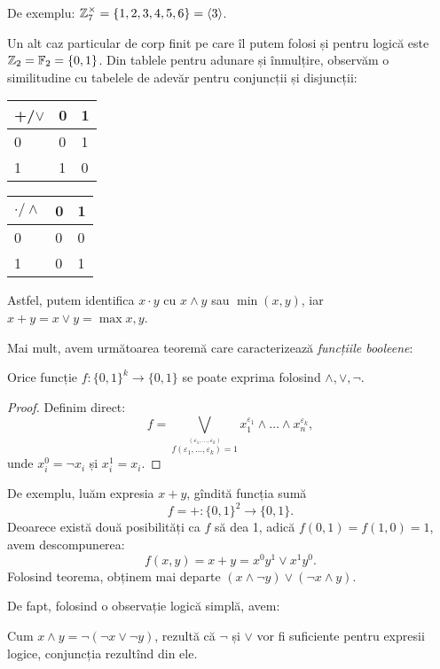 De exemplu: $ \mathbb{Z}_7^\times = \{ 1, 2, 3, 4, 5, 6 \} = \langle 3 \rangle $.

Un alt caz particular de corp finit pe care îl putem folosi și pentru
logică este $ \mathbb{Z}_2 = \mathbb{F}_2 = \{ 0, 1 \} $. Din tablele pentru adunare
și înmulțire, observăm o similitudine cu tabelele de adevăr pentru
conjuncții și disjuncții:
\begin{center}
  \begin{tabular}{l|ll}
    +/$\lor$ & 0 & 1 \\
    \hline
    0 & 0 & 1 \\
    1 & 1 & 0
  \end{tabular}
  \qquad
  \begin{tabular}{l|ll}
    $\cdot/\land$ & 0 & 1 \\
    \hline
    0 & 0 & 0 \\
    1 & 0 & 1
  \end{tabular}
\end{center}

Astfel, putem identifica $ x\cdot y $ cu $ x \land y $ sau $ \min(x, y) $, iar
$ x + y = x \lor y = \max{x, y} $.

Mai mult, avem următoarea teoremă care caracterizează \emph{funcțiile booleene}:
\begin{theorem}\label{thm:functie-sau-si}
  Orice funcție $ f : \{ 0, 1 \}^k \to \{0, 1\} $ se poate exprima
  folosind $ \land, \lor, \lnot $.
\end{theorem}

\begin{proof}
  Definim direct:
  \[
    f = \bigvee_{\stackrel{(\varepsilon_1, \dots, %
        \varepsilon_k)}{f(\varepsilon_1, \dots, \varepsilon_k)=1}} %
    x_1^{\varepsilon_1} \land \dots \land x_n^{\varepsilon_k},
  \]
  unde $ x_i^0 = \lnot x_i $ și $ x_i^1 = x_i $.
\end{proof}

De exemplu, luăm expresia $ x + y $, gîndită funcția sumă
\[
  f = + : \{ 0, 1\}^2 \to \{0, 1\}.
\]
Deoarece există două posibilități ca $ f $ să dea 1, adică $ f(0, 1) = f(1, 0) = 1 $,
avem descompunerea:
\[
  f(x, y) = x + y = x^0 y^1 \lor x^1y^0.
\]
Folosind teorema, obținem mai departe $ (x \land \lnot y) \lor (\lnot x \land y) $.

De fapt, folosind o observație logică simplă, avem:
\begin{remark}\label{rk:not-lor-land}
  Cum $ x \land y = \lnot (\lnot x \lor \lnot y) $, rezultă că $ \lnot $ și $ \lor $
  vor fi suficiente pentru expresii logice, conjuncția rezultînd din ele.
\end{remark}

